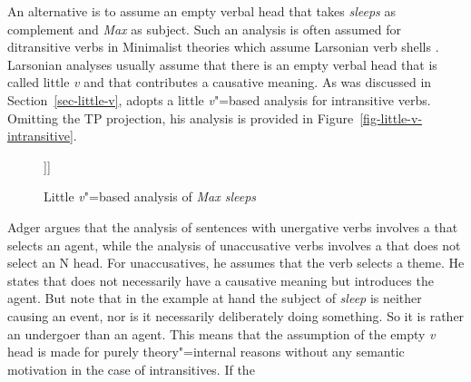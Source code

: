 An alternative is to assume an empty verbal head that takes \emph{sleeps} as complement and
\emph{Max} as subject. Such an analysis is often assumed for ditransitive verbs in Minimalist
theories which assume Larsonian verb shells \citep{Larson88a}. Larsonian analyses usually assume
that there is an empty verbal head that is called little \emph{v} and that contributes a causative
meaning. As was discussed in Section~\ref{sec-little-v}, \citet{Adger2003a} adopts a little \emph{v}"=based analysis for intransitive verbs. Omitting the
TP projection, his analysis is provided in Figure~\vref{fig-little-v-intransitive}.
\begin{figure}
\begin{forest}
[\emph{v}P
  [\emph{Max}]
  [{$\overline{v}$}
    [\textit{v}]
    [\emph{sleep}]]]
\end{forest}
\caption{\label{fig-little-v-intransitive}Little \emph{v}"=based analysis of \emph{Max sleeps}}
\end{figure}%
Adger argues that the analysis of sentences with unergative verbs involves a \littlev that
selects an agent, while the analysis of unaccusative verbs involves a \littlev that does not
select an N head. For unaccusatives, he assumes that the verb selects a theme. 
He states that \littlev does not necessarily have a causative meaning but introduces the agent. But note that in
the example at hand the subject of \emph{sleep} is neither causing an event, nor is it necessarily
deliberately doing something. So it is rather an undergoer than an agent. This means that the assumption of the empty \emph{v} head is made for
purely theory"=internal reasons without any semantic motivation in the case of intransitives. If the

